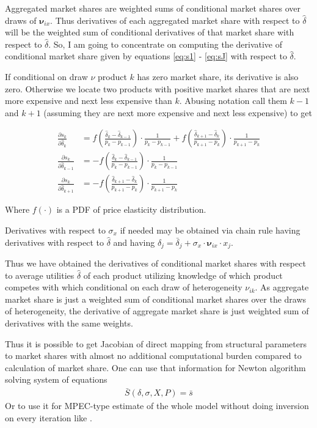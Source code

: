 \documentclass[12pt,letterpaper]{article}
\begin{document}
	Aggregated market shares are weighted sums of conditional market shares over draws of $\boldsymbol{\nu}_{ix}$. Thus derivatives of each aggregated market share with respect to $\hat\delta$ will be the weighted sum of conditional derivatives of that market share with respect to $\hat \delta$. So, I am going to concentrate on computing the derivative of conditional market share given by equations \ref{eq:s1} - \ref{eq:sJ} with respect to $\hat{\delta}$.
	
	If conditional on draw $\nu$ product $k$ has zero market share, its derivative is also zero. Otherwise we locate two products with positive market shares that are next more expensive and next less expensive than $k$. Abusing notation call them $k-1$ and $k+1$ (assuming they are next more expensive and next less expensive) to get
	
	\begin{align}
	\frac{\partial s_k}{\partial \hat \delta_k} &= f\left(\frac{\hat\delta_k - \hat\delta_{k-1}}{p_k - p_{k-1}}\right)\cdot \frac 1{p_k - p_{k-1}} + f\left(\frac{\hat\delta_{k+1} - \hat\delta_{k}}{p_{k+1} - p_{k}}\right)\cdot \frac 1{p_{k+1} - p_{k}} \\
	\frac{\partial s_k}{\partial \hat \delta_{k-1}} &= -f\left(\frac{\hat\delta_k - \hat\delta_{k-1}}{p_k - p_{k-1}}\right)\cdot \frac 1{p_k - p_{k-1}} \\
	\frac{\partial s_k}{\partial \hat \delta_{k+1}} &= -f\left(\frac{\hat\delta_{k+1} - \hat\delta_{k}}{p_{k+1} - p_{k}}\right) \cdot \frac 1{p_{k+1} - p_{k}}
	\end{align}
	
	Where $f(\cdot)$ is a PDF of price elasticity distribution.
	
	Derivatives with respect to $\sigma_{x}$ if needed may be obtained via chain rule having derivatives with respect to $\hat{\delta}$ and having $\hat \delta_j = {\bar \delta_j} + \sigma_x \cdot \boldsymbol{\nu}_{ix} \cdot x_j$. 
	
	Thus we have obtained the derivatives of conditional market shares with respect to average utilities $\hat \delta$ of each product utilizing knowledge of which product competes with which conditional on each draw of heterogeneity $\nu_{ik}$. As aggregate market share is just a weighted sum of conditional market shares over the draws of heterogeneity, the derivative of aggregate market share is just weighted sum of derivatives with the same weights. 
	
	Thus it is possible to get Jacobian of direct mapping from structural parameters to market shares with almost no additional computational burden compared to calculation of market share. One can use that information for Newton algorithm solving system of equations 
	\begin{align}
	\bar S(\delta,\sigma,X,P) = \bar s
	\end{align}
	Or to use it for MPEC-type estimate of the whole model without doing inversion on every iteration like \cite{dube2012improving}.
	
\end{document}
